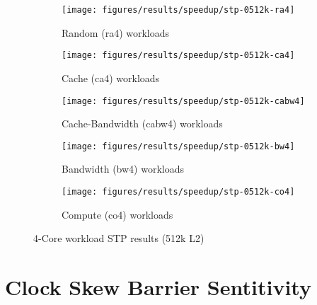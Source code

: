 \begin{figure}
    \centering
    \begin{subfigure}[b]{\textwidth}
            \texttt{[image: figures/results/speedup/stp-0512k-ra4]}
            \caption{Random (ra4) workloads}
            \label{fig:results:4core:stp:random}
    \end{subfigure}

    \begin{subfigure}[b]{0.5\textwidth}
            \texttt{[image: figures/results/speedup/stp-0512k-ca4]}
            \caption{Cache (ca4) workloads}
            \label{fig:results:4core:stp:cache}
    \end{subfigure}%
    \begin{subfigure}[b]{0.5\textwidth}
            \texttt{[image: figures/results/speedup/stp-0512k-cabw4]}
            \caption{Cache-Bandwidth (cabw4) workloads}
            \label{fig:results:4core:stp:cache-bw}
    \end{subfigure}

    \begin{subfigure}[b]{0.5\textwidth}
            \texttt{[image: figures/results/speedup/stp-0512k-bw4]}
            \caption{Bandwidth (bw4) workloads}
            \label{fig:results:4core:stp:bw}
    \end{subfigure}%
    \begin{subfigure}[b]{0.5\textwidth}
            \texttt{[image: figures/results/speedup/stp-0512k-co4]}
            \caption{Compute (co4) workloads}
            \label{fig:results:4core:stp:co}
    \end{subfigure}%

    \caption{4-Core workload STP results (512k L2)}\label{fig:results:4core:stp}
\end{figure}

\section{Clock Skew Barrier Sentitivity}
